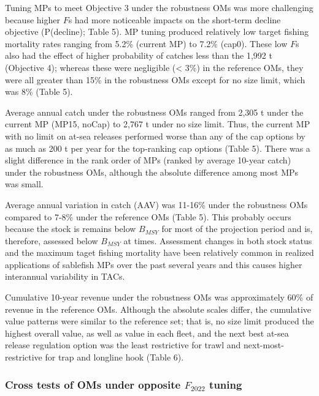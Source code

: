 \documentclass[11pt]{book}
\begin{document}
Tuning MPs to meet Objective 3 under the robustness OMs was more challenging because higher \(F\)s had more noticeable impacts on the short-term decline objective (P(decline); Table 5). MP tuning produced relatively low target fishing mortality rates ranging from 5.2\% (current MP) to 7.2\% (cap0). These low \(F\)s also had the effect of higher probability of catches less than the 1,992 t (Objective 4); whereas these were negligible (\textless{} 3\%) in the reference OMs, they were all greater than 15\% in the robustness OMs except for no size limit, which was 8\% (Table 5).

Average annual catch under the robustness OMs ranged from 2,305 t under the current MP (MP15, noCap) to 2,767 t under no size limit. Thus, the current MP with no limit on at-sea releases performed worse than any of the cap options by as much as 200 t per year for the top-ranking cap options (Table 5). There was a slight difference in the rank order of MPs (ranked by average 10-year catch) under the robustness OMs, although the absolute difference among most MPs was small.

Average annual variation in catch (AAV) was 11-16\% under the robustness OMs compared to 7-8\% under the reference OMs (Table 5). This probably occurs because the stock is remains below \(B_{MSY}\) for most of the projection period and is, therefore, assessed below \(B_{MSY}\) at times. Assessment changes in both stock status and the maximum taget fishing mortality have been relatively common in realized applications of sablefish MPs over the past several years and this causes higher interannual variability in TACs.

Cumulative 10-year revenue under the robustness OMs was approximately 60\% of revenue in the reference OMs. Although the absolute scales differ, the cumulative value patterns were similar to the reference set; that is, no size limit produced the highest overall value, as well as value in each fleet, and the next best at-sea release regulation option was the least restrictive for trawl and next-most-restrictive for trap and longline hook (Table 6).

\hypertarget{cross-tests-of-oms-under-opposite-f_2022-tuning}{%
\subsubsection{\texorpdfstring{Cross tests of OMs under opposite \(F_{2022}\) tuning}{Cross tests of OMs under opposite F\_\{2022\} tuning}}\label{cross-tests-of-oms-under-opposite-f_2022-tuning}}
\end{document}
